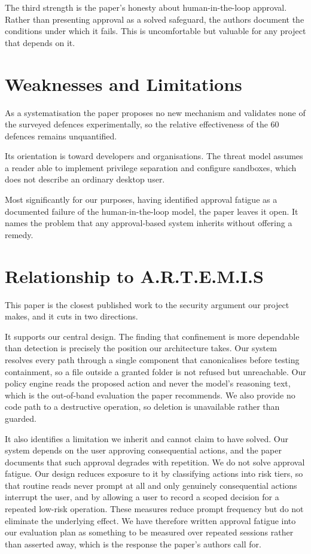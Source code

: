 \documentclass[11pt,a4paper]{article}
\begin{document}
The third strength is the paper's honesty about human-in-the-loop approval.
Rather than presenting approval as a solved safeguard, the authors document the
conditions under which it fails. This is uncomfortable but valuable for any
project that depends on it.

\section{Weaknesses and Limitations}

As a systematisation the paper proposes no new mechanism and validates none of
the surveyed defences experimentally, so the relative effectiveness of the 60
defences remains unquantified.

Its orientation is toward developers and organisations. The threat model
assumes a reader able to implement privilege separation and configure
sandboxes, which does not describe an ordinary desktop user.

Most significantly for our purposes, having identified approval fatigue as a
documented failure of the human-in-the-loop model, the paper leaves it open. It
names the problem that any approval-based system inherits without offering a
remedy.

\section{Relationship to A.R.T.E.M.I.S}

This paper is the closest published work to the security argument our project
makes, and it cuts in two directions.

It supports our central design. The finding that confinement is more dependable
than detection is precisely the position our architecture takes. Our system
resolves every path through a single component that canonicalises before testing
containment, so a file outside a granted folder is not refused but unreachable.
Our policy engine reads the proposed action and never the model's reasoning
text, which is the out-of-band evaluation the paper recommends. We also provide
no code path to a destructive operation, so deletion is unavailable rather than
guarded.

It also identifies a limitation we inherit and cannot claim to have solved. Our
system depends on the user approving consequential actions, and the paper
documents that such approval degrades with repetition. We do not solve approval
fatigue. Our design reduces exposure to it by classifying actions into risk
tiers, so that routine reads never prompt at all and only genuinely consequential
actions interrupt the user, and by allowing a user to record a scoped decision
for a repeated low-risk operation. These measures reduce prompt frequency but do
not eliminate the underlying effect. We have therefore written approval fatigue
into our evaluation plan as something to be measured over repeated sessions
rather than asserted away, which is the response the paper's authors call for.
\end{document}
